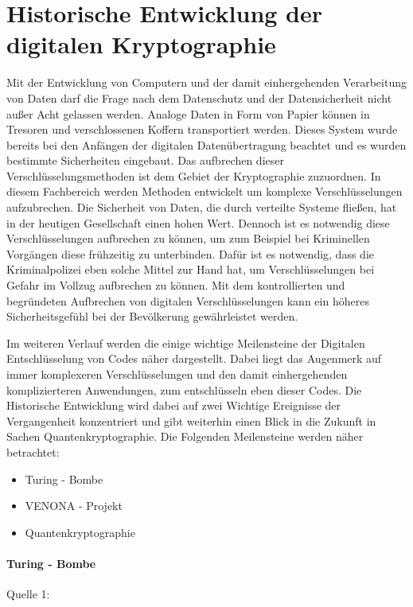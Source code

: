 \chapter{Historische Entwicklung der digitalen Kryptographie}

Mit der Entwicklung von Computern und der damit einhergehenden Verarbeitung von Daten darf die Frage nach dem Datenschutz und der Datensicherheit nicht außer Acht gelassen werden. Analoge Daten in Form von Papier können in Tresoren und verschlossenen Koffern transportiert werden. Dieses System wurde bereits bei den Anfängen der digitalen Datenübertragung beachtet und es wurden bestimmte Sicherheiten eingebaut.
Das aufbrechen dieser Verschlüsselungsmethoden ist dem Gebiet der Kryptographie zuzuordnen. In diesem Fachbereich werden Methoden entwickelt um komplexe Verschlüsselungen aufzubrechen.
Die Sicherheit von Daten, die durch verteilte Systeme fließen, hat in der heutigen Gesellschaft einen hohen Wert. Dennoch ist es notwendig diese Verschlüsselungen aufbrechen zu können, um zum Beispiel bei Kriminellen Vorgängen diese frühzeitig zu unterbinden. Dafür ist es notwendig, dass die Kriminalpolizei eben solche Mittel zur Hand hat, um Verschlüsselungen bei Gefahr im Vollzug aufbrechen zu können. Mit dem kontrollierten und begründeten Aufbrechen von digitalen Verschlüsselungen kann ein höheres Sicherheitsgefühl bei der Bevölkerung gewährleistet werden.

Im weiteren Verlauf werden die einige wichtige Meilensteine der Digitalen Entschlüsselung von Codes näher dargestellt. Dabei liegt das Augenmerk auf immer komplexeren Verschlüsselungen und den damit einhergehenden komplizierteren Anwendungen, zum entschlüsseln eben dieser Codes. Die Historische Entwicklung wird dabei auf zwei Wichtige Ereignisse der Vergangenheit konzentriert und gibt weiterhin einen Blick in die Zukunft in Sachen Quantenkryptographie. Die Folgenden Meilensteine werden näher betrachtet:
\begin{itemize}
	\item Turing - Bombe
	\item VENONA - Projekt
	\item Quantenkryptographie
\end{itemize}

\subsubsection{Turing - Bombe}
Quelle 1:

\cite{bloemer_2012}

